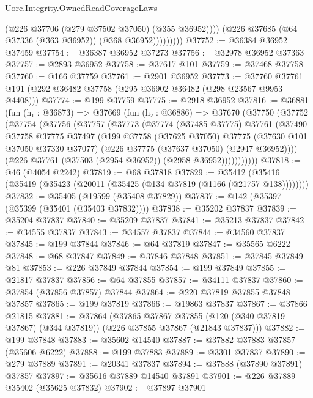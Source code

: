 \begin{lexlean}{Uorc.Integrity.OwnedReadCoverageLaws}
\begin{coremodule}
                      (@226 @37706 (@279 @37502 @37050) (@355 @36952))))
                  (@226 @37685 (@64 @37336 (@363 @36952)) (@368 @36952)))))))))
@37752 := @36384 @36952 @37459
@37754 := @36387 @36952 @37273
@37756 := @32978 @36952 @37363
@37757 := @2893 @36952
@37758 := @37617 @101
@37759 := @37468 @37758
@37760 := @166 @37759
@37761 := @2901 @36952
@37773 := @37760 @37761 @191 (@292 @36482 @37758 (@295 @36902 @36482 (@298 @23567 @9953 @4408)))
@37774 := @199 @37759
@37775 := @2918 @36952
@37816 := @36881
    (fun (h₁ : @36873) =>
    @37669
      (fun (h₂ : @36886) =>
      @37670
        (@37750
          (@37752
            (@37754
              (@37756
                (@37757
                  (@37773
                    (@37774
                      (@37485 @37775)
                      @37761
                      (@37490
                        @37758
                        @37775
                        @37497
                        (@199
                          @37758
                          (@37625 @37050)
                          @37775
                          (@37630 @101 @37050 @37330 @37077)
                          (@226 @37775 (@37637 @37050) (@2947 @36952))))
                      (@226 @37761 (@37503 (@2954 @36952)) (@2958 @36952)))))))))))
@37818 := @46 (@4054 @2242)
@37819 := @68 @37818
@37829 := @35412 (@35416 (@35419 (@35423 (@20011 (@35425 (@134 @37819 (@1166 (@21757 @138))))))))
@37832 := @35405 (@19599 (@35408 @37829))
@37837 := @142 (@35397 (@35399 (@35401 (@35403 @37832))))
@37838 := @35202 @37837
@37839 := @35204 @37837
@37840 := @35209 @37837
@37841 := @35213 @37837
@37842 := @34555 @37837
@37843 := @34557 @37837
@37844 := @34560 @37837
@37845 := @199 @37844
@37846 := @64 @37819
@37847 := @35565 @6222
@37848 := @68 @37847
@37849 := @37846 @37848
@37851 := @37845 @37849 @81
@37853 := @226 @37849 @37844
@37854 := @199 @37849
@37855 := @21817 @37837
@37856 := @64 @37855
@37857 := @34111 @37837
@37860 := @37854 (@37856 @37857) @37844
@37864 := @220 @37819 @37855 @37848 @37857
@37865 := @199 @37819
@37866 := @19863 @37837
@37867 := @37866 @21815
@37881 := @37864
    (@37865
      @37867
      @37855
      (@120 (@340 @37819 @37867) (@344 @37819))
      (@226 @37855 @37867 (@21843 @37837)))
@37882 := @199 @37848
@37883 := @35602 @14540
@37887 := @37882 @37883 @37857 (@35606 @6222)
@37888 := @199 @37883
@37889 := @3301 @37837
@37890 := @279 @37889
@37891 := @20341 @37837
@37894 := @37888 (@37890 @37891) @37857
@37897 := @35616 @37889 @14540 @37891
@37901 := @226 @37889 @35402 (@35625 @37832)
@37902 := @37897 @37901

\end{coremodule}
\end{lexlean}
